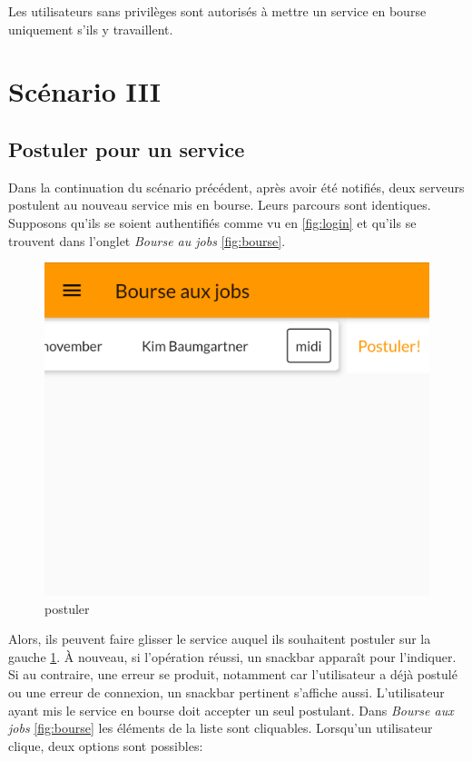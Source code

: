 Les utilisateurs sans privilèges sont autorisés à mettre un service en bourse uniquement s'ils y travaillent.

\section[Postuler pour un service - Scénario III]{Scénario III}
    \subsection*{Postuler pour un service}
    Dans la continuation du scénario précédent, après avoir été notifiés,
    deux serveurs postulent au nouveau service mis
    en bourse. Leurs parcours sont identiques.
    Supposons qu'ils se soient authentifiés comme vu en \ref{fig:login} et qu'ils se trouvent
    dans l'onglet \textit{Bourse au jobs} \ref{fig:bourse}.
    \vfill
    \begin{figure}[h]
        \centering
        \includegraphics[width=.3\linewidth]{screenshots/scenario_03/postuler.png}
        \caption{postuler}
        \label{fig:postuler}
    \end{figure}
    \vfill
    Alors, ils peuvent faire glisser le service auquel ils souhaitent postuler sur
    la gauche \ref{fig:postuler}. À nouveau, si l'opération réussi, un snackbar apparaît pour l'indiquer. Si au contraire, une
    erreur se produit, notamment car l'utilisateur a déjà postulé ou une erreur de connexion, un snackbar pertinent s'affiche aussi.
    \newpage
    L'utilisateur ayant mis le service en bourse doit accepter un seul postulant. Dans \textit{Bourse aux jobs} \ref{fig:bourse} les éléments de 
    la liste sont cliquables. Lorsqu'un utilisateur clique, deux options sont possibles:
    \smallskip
